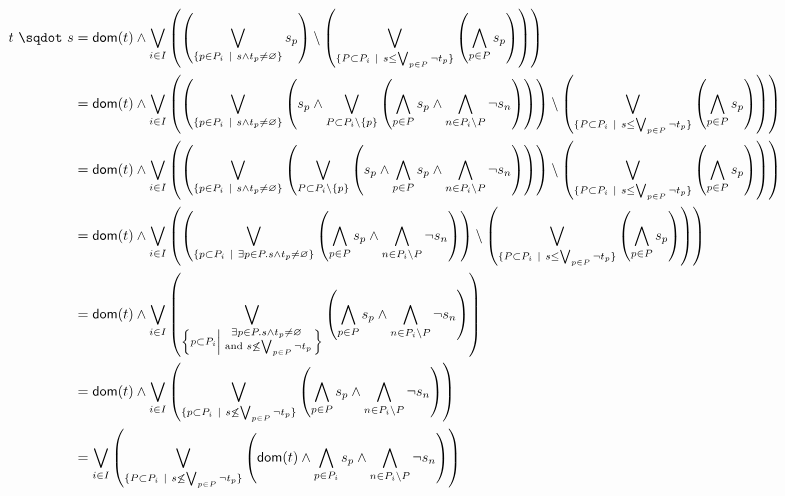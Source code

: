 \documentclass[a4paper]{article}%
\newcommand{\worra}[2]{#1\mathop{\,\sqdot\,} #2}
\newcommand{\dom}[1]{\textsf{dom}(#1)}
\newcommand{\alt}{~|~}
\begin{document}
    \begin{align*}
        \worra t s & = \dom t \wedge\bigvee_{i\in I}\left(\left(\bigvee_{\{p\in P_i\alt s\wedge t_p\not=\varnothing\}}s_p\right)
            \setminus \left(\bigvee_{\{P \subset P_i\alt s \leq \bigvee_{p \in P} \neg t_p\}} \left(\bigwedge_{p \in P} s_p\right) \right)\right)\\
        & = \dom t \wedge\bigvee_{i\in I}\left(\left(\bigvee_{\{p\in P_i\alt s\wedge t_p\not=\varnothing\}}\left(
            s_p \land \bigvee_{P \subset P_i \setminus \{p\}} \left(\bigwedge_{p \in P} s_p \land \bigwedge_{n \in P_i \setminus P} \neg s_n \right)\right)\right)
            \setminus \left(\bigvee_{\{P \subset P_i\alt s \leq \bigvee_{p \in P} \neg t_p\}} \left(\bigwedge_{p \in P} s_p\right) \right)\right)\\
        & = \dom t \wedge\bigvee_{i\in I}\left(\left(\bigvee_{\{p\in P_i\alt s\wedge t_p\not=\varnothing\}}\left(
            \bigvee_{P \subset P_i \setminus \{p\}} \left(s_p \land \bigwedge_{p \in P} s_p \land \bigwedge_{n \in P_i \setminus P} \neg s_n \right)\right)\right)
            \setminus \left(\bigvee_{\{P \subset P_i\alt s \leq \bigvee_{p \in P} \neg t_p\}} \left(\bigwedge_{p \in P} s_p\right) \right)\right)\\    
        & = \dom t \wedge\bigvee_{i\in I}\left(\left(\bigvee_{\{p\subset P_i\alt \exists p \in P. s\wedge t_p\not=\varnothing\}}\left(
            \bigwedge_{p \in P} s_p \land \bigwedge_{n \in P_i \setminus P} \neg s_n \right)\right)
            \setminus \left(\bigvee_{\{P \subset P_i\alt s \leq \bigvee_{p \in P} \neg t_p\}} \left(\bigwedge_{p \in P} s_p\right) \right)\right)\\        
        & = \dom t \wedge\bigvee_{i\in I}\left(\bigvee_{\left\{p\subset P_i\left|
            \substack{\exists p \in P. s\wedge t_p\not=\varnothing\\
            \text{ and } s \not\leq \bigvee_{p \in P} \neg t_p}
            \right.\right\}}\left(
            \bigwedge_{p \in P} s_p \land \bigwedge_{n \in P_i \setminus P} \neg s_n \right)\right)\\
        & = \dom t \wedge\bigvee_{i\in I}\left(\bigvee_{\{p\subset P_i\alt s \not\leq \bigvee_{p \in P} \neg t_p \}}\left(
            \bigwedge_{p \in P} s_p \land \bigwedge_{n \in P_i \setminus P} \neg s_n \right)\right)\\
        & = \bigvee_{i \in I} \left( \bigvee_{\{P \subset P_i\alt s \not\leq \bigvee_{p \in P} \neg t_p \} }\left(
            \dom t \land \bigwedge_{p\in P_i} s_p \land \bigwedge_{n \in P_i \setminus P} \neg s_n \right)\right)
    \end{align*}
\end{document}
